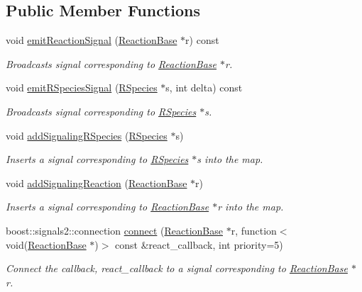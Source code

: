 \subsection*{Public Member Functions}
\begin{DoxyCompactItemize}
\item 
void \hyperlink{classChemSignal_ab34f019b2a982650cafe7c272eeb626f}{emit\+Reaction\+Signal} (\hyperlink{classReactionBase}{Reaction\+Base} $\ast$r) const 
\begin{DoxyCompactList}\small\item\em Broadcasts signal corresponding to \hyperlink{classReactionBase}{Reaction\+Base} $\ast$r. \end{DoxyCompactList}\item 
void \hyperlink{classChemSignal_af8123a3b376bd247c8f1c1c5a71dcb82}{emit\+R\+Species\+Signal} (\hyperlink{classRSpecies}{R\+Species} $\ast$s, int delta) const 
\begin{DoxyCompactList}\small\item\em Broadcasts signal corresponding to \hyperlink{classRSpecies}{R\+Species} $\ast$s. \end{DoxyCompactList}\item 
void \hyperlink{classChemSignal_a739d867462daa1a637842f21f04516fb}{add\+Signaling\+R\+Species} (\hyperlink{classRSpecies}{R\+Species} $\ast$s)
\begin{DoxyCompactList}\small\item\em Inserts a signal corresponding to \hyperlink{classRSpecies}{R\+Species} $\ast$s into the map. \end{DoxyCompactList}\item 
void \hyperlink{classChemSignal_a62e4675ca1857323bb3d1399546a9485}{add\+Signaling\+Reaction} (\hyperlink{classReactionBase}{Reaction\+Base} $\ast$r)
\begin{DoxyCompactList}\small\item\em Inserts a signal corresponding to \hyperlink{classReactionBase}{Reaction\+Base} $\ast$r into the map. \end{DoxyCompactList}\item 
boost\+::signals2\+::connection \hyperlink{classChemSignal_a2c9b051880948d7721609d16cd8efcb0}{connect} (\hyperlink{classReactionBase}{Reaction\+Base} $\ast$r, function$<$ void(\hyperlink{classReactionBase}{Reaction\+Base} $\ast$)$>$ const \&react\+\_\+callback, int priority=5)
\begin{DoxyCompactList}\small\item\em Connect the callback, react\+\_\+callback to a signal corresponding to \hyperlink{classReactionBase}{Reaction\+Base} $\ast$r. \end{DoxyCompactList}\item 

\end{DoxyCompactItemize}
